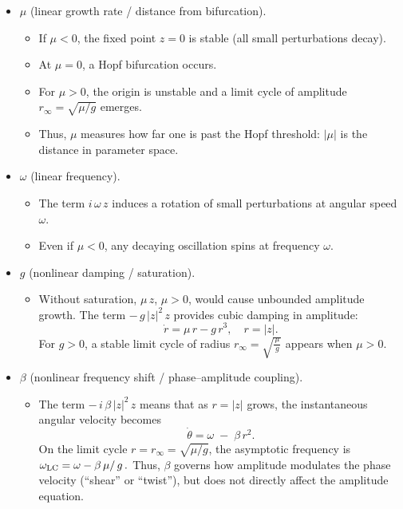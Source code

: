  \begin{itemize}
  \item \(\mu\) (linear growth rate / distance from bifurcation).  
    \begin{itemize}
      \item If \(\mu<0\), the fixed point \(z=0\) is stable (all small perturbations decay).  
      \item At \(\mu=0\), a Hopf bifurcation occurs.  
      \item For \(\mu>0\), the origin is unstable and a limit cycle of amplitude \(r_{\infty}=\sqrt{\mu/g}\) emerges.  
      \item Thus, \(\mu\) measures how far one is past the Hopf threshold: \(\lvert\mu\rvert\) is the distance in parameter space.
    \end{itemize}

  \item \(\omega\) (linear frequency).  
    \begin{itemize}
      \item The term \(i\,\omega\,z\) induces a rotation of small perturbations at angular speed \(\omega\).  
      \item Even if \(\mu<0\), any decaying oscillation spins at frequency \(\omega\).
    \end{itemize}

  \item \(g\) (nonlinear damping / saturation).  
    \begin{itemize}
      \item Without saturation, \(\mu\,z\), $\mu>0$, would cause unbounded amplitude growth.  
      The term \(-\,g\,\lvert z\rvert^2\,z\) provides cubic damping in amplitude:
      \[
      \dot r = \mu\,r - g\,r^3,\quad r = \lvert z\rvert.
      \]
      For \(g>0\), a stable limit cycle of radius 
      \(\displaystyle r_{\infty} = \sqrt{\frac{\mu}{\,g\,}}\) 
      appears when \(\mu>0\).
    \end{itemize}

  \item \(\beta\) (nonlinear frequency shift / phase–amplitude coupling).  
    \begin{itemize}
      \item The term \(-\,i\,\beta\,\lvert z\rvert^2\,z\) means that as \(r=\lvert z\rvert\) grows, the instantaneous angular velocity becomes
      \[
      \dot\theta = \omega \;-\; \beta\,r^2.
      \]
        On the limit cycle \(r = r_{\infty} = \sqrt{\mu/g}\), the asymptotic frequency is
      \(\displaystyle \omega_{\rm LC} = \omega - \beta\,{\mu}/{\,g\,}.\)
     Thus, \(\beta\) governs how amplitude modulates the phase velocity (``shear'' or ``twist''), but does not directly affect the amplitude equation.
    \end{itemize}
\end{itemize}


